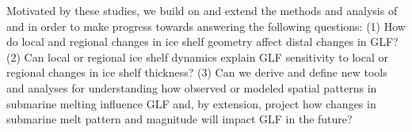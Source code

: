 \documentclass[review,oneside]{igs}
\begin{document}


Motivated by these studies, we build on and extend the methods and analysis of \cite{furst2016} and \cite{reese2018} in order to make progress towards answering the following questions: 
(1) How do local and regional changes in ice shelf geometry affect distal changes in GLF? (2) Can local or regional ice shelf dynamics explain GLF sensitivity to local or regional changes in ice shelf thickness? (3) Can we derive and define new tools and analyses for understanding how observed or modeled spatial patterns in submarine melting influence GLF and, by extension, project how changes in submarine melt pattern and magnitude will impact GLF in the future?     

\end{document}

